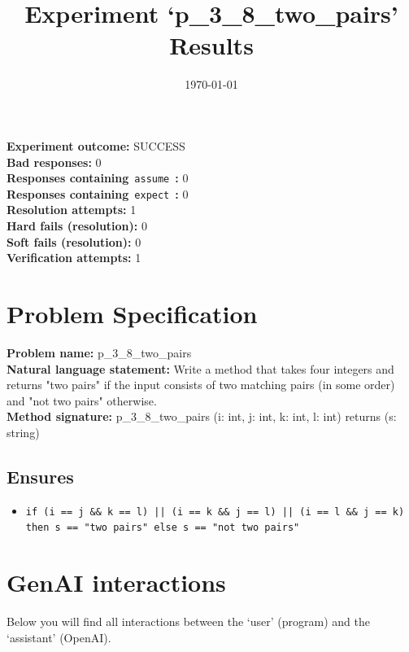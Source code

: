\documentclass{article}
\begin{document}
\title{Experiment `p\_3\_8\_two\_pairs' Results}
\author{\today}
\date{}
\maketitle
\textbf{Experiment outcome: }SUCCESS
\\\textbf{Bad responses: }0
\\\textbf{Responses containing}~\texttt{assume}~\textbf{: }0
\\\textbf{Responses containing}~\texttt{expect}~\textbf{: }0
\\\textbf{Resolution attempts: }1
\\\textbf{Hard fails (resolution): }0
\\\textbf{Soft fails (resolution): }0
\\\textbf{Verification attempts: }1
\section*{Problem Specification}
\textbf{Problem name: }p\_3\_8\_two\_pairs
\\\textbf{Natural language statement: }Write a method that takes four integers and returns "two pairs" if the input consists of two matching pairs (in some order) and "not two pairs" otherwise.
\\\textbf{Method signature: }p\_3\_8\_two\_pairs (i: int, j: int, k: int, l: int) returns (s: string)
\subsection*{Ensures}
\begin{itemize}
\item \texttt{if (i == j \&\& k == l) || (i == k \&\& j == l) || (i == l \&\& j == k) then s == "two pairs" else s == "not two pairs"}
\end{itemize}
\clearpage
\section*{GenAI interactions}
Below you will find all interactions between the `user' (program) and the `assistant' (OpenAI).
\end{document}
